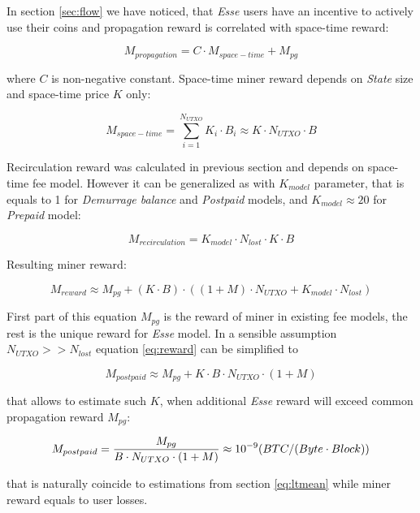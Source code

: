 \documentclass[]{article}   %
\newcommand{\esse}{\textit{Esse}}
\newcommand{\state}{\textit{State}}
\begin{document}
In section \ref{sec:flow} we have noticed, that \esse{} users have an incentive to actively use their coins and propagation reward is correlated with space-time reward:

\begin{equation}
M_{propagation} = C \cdot M_{space-time} + M_{pg}
\end{equation}

where $C$ is non-negative constant. Space-time miner reward depends on \state{} size and space-time price $K$ only:

\begin{equation}
M_{space-time} = \sum_{i=1}^{N_{UTXO}} K_i \cdot B_i \approx K \cdot N_{UTXO} \cdot B
\end{equation}

Recirculation reward was calculated in previous section and depends on space-time fee model. However it can be generalized as with $K_{model}$ parameter, that is equals to 1 for \textit{Demurrage balance} and \textit{Postpaid} models, and $K_{model} \approx 20$ for \textit{Prepaid} model:

\begin{equation}
M_{recirculation} = {K_{model} \cdot  N_{lost} \cdot K \cdot B}
\end{equation}

Resulting miner reward:

\begin{equation}
\label{eq:reward}
M_{reward} \approx M_{pg} + (K \cdot B) \cdot ((1 + M) \cdot N_{UTXO} + K_{model} \cdot N_{lost})
\end{equation}

First part of this equation $M_{pg}$ is the reward of miner in existing fee models, the rest is the unique reward for \esse{} model.  In a sensible assumption $N_{UTXO} >> N_{lost}$ equation \ref{eq:reward} can be simplified to

\begin{equation}
M_{postpaid} \approx M_{pg} + K \cdot B \cdot N_{UTXO} \cdot (1 + M)
\end{equation}

that allows to estimate such $K$, when additional \esse{} reward will exceed common propagation reward $M_{pg}$:

\begin{equation}
M_{postpaid} = {M_{pg} \over B \cdot N_{UTXO} \cdot (1 + M)} \approx 10^{-9} ({BTC / (Byte \cdot Block)})
\end{equation}

that is naturally coincide to estimations from section \ref{eq:ltmean} while miner reward equals to user losses.
\end{document}
